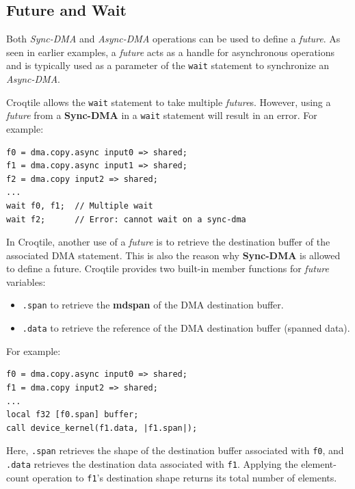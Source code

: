 \subsection*{Future and Wait}

Both \emph{Sync-DMA} and \emph{Async-DMA} operations can be used to define a \emph{future}. As seen in earlier examples, a \emph{future} acts as a handle for asynchronous operations and is typically used as a parameter of the \texttt{wait} statement to synchronize an \emph{Async-DMA}.

Croqtile allows the \texttt{wait} statement to take multiple \emph{future}s. However, using a \emph{future} from a \textbf{Sync-DMA} in a \texttt{wait} statement will result in an error. For example:

\begin{lstlisting}[language=croqtile,caption={Two asynchronous copies}]
f0 = dma.copy.async input0 => shared;
f1 = dma.copy.async input1 => shared;
f2 = dma.copy input2 => shared;
...
wait f0, f1;  // Multiple wait
wait f2;      // Error: cannot wait on a sync-dma
\end{lstlisting}

In Croqtile, another use of a \emph{future} is to retrieve the destination buffer of the associated DMA statement. This is also the reason why \textbf{Sync-DMA} is allowed to define a future. Croqtile provides two built-in member functions for \emph{future} variables:

\begin{itemize}[leftmargin=1.6em]
\item \texttt{.span} to retrieve the \textbf{mdspan} of the DMA destination buffer.
\item \texttt{.data} to retrieve the reference of the DMA destination buffer (spanned data).
\end{itemize}

For example:

\begin{lstlisting}[language=croqtile,caption={Waiting on both futures}]
f0 = dma.copy.async input0 => shared;
f1 = dma.copy input2 => shared;
...
local f32 [f0.span] buffer;
call device_kernel(f1.data, |f1.span|);
\end{lstlisting}

Here, \texttt{.span} retrieves the shape of the destination buffer associated with \texttt{f0}, and \texttt{.data} retrieves the destination data associated with \texttt{f1}. Applying the element-count operation to \texttt{f1}'s destination shape returns its total number of elements.
